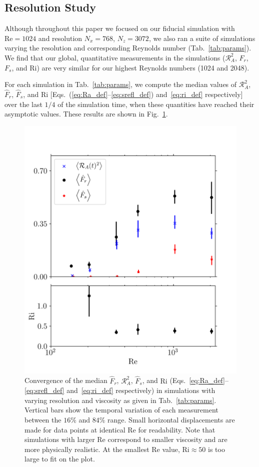 \documentclass[
        fleqn,
        usenatbib,
    ]{mnras}
\begin{document}
\subsection{Resolution Study}\label{ss:convergence}

Although throughout this paper we focused on our fiducial simulation with
$\mathrm{Re} = 1024$ and resolution $N_x=768$, $N_z=3072$, we also ran a suite
of simulations varying the resolution and corresponding Reynolds number
(Tab.~\ref{tab:params}). We find that our global, quantitative measurements in
the simulations ($\mathcal{R}_A^2$, $F_r$, $F_s$, and $\mathrm{Ri}$) are very
similar for our highest Reynolds numbers (1024 and 2048).

For each simulation in Tab.~\ref{tab:params}, we compute the median values of
$\mathcal{R}_A^2$, $\hat{F}_r$, $\hat{F}_s$, and $\mathrm{Ri}$
[Eqs.~(\ref{eq:Ra_def}--\ref{eq:srefl_def}) and~\eqref{eq:ri_def}
respectively] over the last $1/4$ of the simulation time, when these quantities
have reached their asymptotic values. These results are shown in
Fig.~\ref{fig:agg}.

\begin{figure}
    \centering
    \includegraphics[width=0.9\columnwidth]{plots/agg.png}
    \caption{Convergence of the median $\hat{F}_r$, $\mathcal{R}_A^2$,
    $\hat{F}_s$, and $\mathrm{Ri}$ (Eqs.~\eqref{eq:Ra_def}--\eqref{eq:srefl_def}
    and~\eqref{eq:ri_def} respectively) in simulations with varying resolution
    and viscosity as given in Tab.~\ref{tab:params}. Vertical bars show the
    temporal variation of each measurement between the $16\%$ and $84\%$ range.
    Small horizontal displacements are made for data points at identical
    $\mathrm{Re}$ for readability. Note that simulations with larger
    $\mathrm{Re}$ correspond to smaller viscosity and are more physically
    realistic. At the smallest $\mathrm{Re}$ value, $\mathrm{Ri} \approx 50$ is
    too large to fit on the plot.}\label{fig:agg}
\end{figure}
\end{document}
